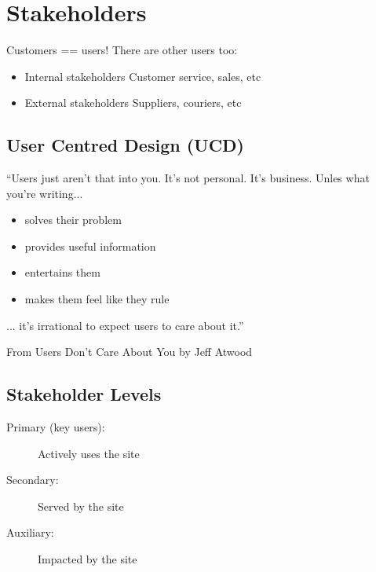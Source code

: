\section{Stakeholders}
Customers == users! There are other users too:
\begin{itemize}
	\item Internal stakeholders
	\subitem Customer service, sales, etc
	\item External stakeholders
	\subitem Suppliers, couriers, etc	
\end{itemize}

\subsection{User Centred Design (UCD)}
\begin{leftbar}
	``Users just aren't that into you. It's not personal. It's business. Unles what you're writing...
	\begin{itemize}
		\item solves their problem
		\item provides useful information
		\item entertains them
		\item makes them feel like they rule	
	\end{itemize}
	... it's irrational to expect users to care about it.''
\end{leftbar}
From Users Don't Care About You by Jeff Atwood

\subsection{Stakeholder Levels}
\begin{description}
	\item[Primary (key users):] Actively uses the site
	\item[Secondary:] Served by the site
	\item[Auxiliary:] Impacted by the site	
\end{description}

